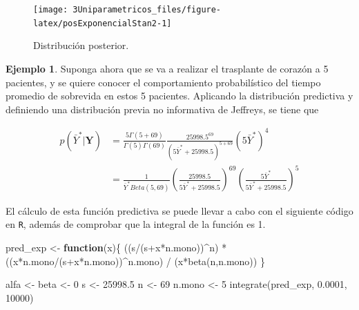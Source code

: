 \documentclass[
  10pt,
  spanish,
]{book}
\newenvironment{Shaded}{\begin{snugshade}}{\end{snugshade}}
\newcommand{\ControlFlowTok}[1]{\textcolor[rgb]{0.13,0.29,0.53}{\textbf{#1}}}
\newcommand{\DecValTok}[1]{\textcolor[rgb]{0.00,0.00,0.81}{#1}}
\newcommand{\FloatTok}[1]{\textcolor[rgb]{0.00,0.00,0.81}{#1}}
\newcommand{\FunctionTok}[1]{\textcolor[rgb]{0.00,0.00,0.00}{#1}}
\newcommand{\NormalTok}[1]{#1}
\newcommand{\OtherTok}[1]{\textcolor[rgb]{0.56,0.35,0.01}{#1}}
\newcommand{\SpecialCharTok}[1]{\textcolor[rgb]{0.00,0.00,0.00}{#1}}
\theoremstyle{definition}
\theoremstyle{definition}
\newtheorem{example}{Ejemplo}[chapter]
\theoremstyle{definition}
\theoremstyle{definition}
\theoremstyle{remark}
\begin{document}
\begin{figure}

{\centering \texttt{[image: 3Uniparametricos\_files/figure-latex/posExponencialStan2-1]} 

}

\caption{Distribución posterior.}\label{fig:posExponencialStan2}
\end{figure}

\begin{example}
\protect\hypertarget{exm:unnamed-chunk-65}{}{\label{exm:unnamed-chunk-65} }Suponga ahora que se va a realizar el trasplante de corazón a 5 pacientes, y se quiere conocer el comportamiento probabilístico del tiempo promedio de sobrevida en estos 5 pacientes. Aplicando la distribución predictiva y definiendo una distribución previa no informativa de Jeffreys, se tiene que

\begin{align*}
p(\bar{Y}^*|\mathbf{Y})&=\frac{5\Gamma(5+69)}{\Gamma(5)\Gamma(69)}\frac{25998.5^{69}}{(5\bar{Y}^*+25998.5)^{5+69}}(5\bar{Y}^*)^4\\
&=\frac{1}{\bar{Y}^*Beta(5,69)}\left(\frac{25998.5}{5\bar{Y}^*+25998.5}\right)^{69}\left(\frac{5\bar{Y}^*}{5\bar{Y}^*+25998.5}\right)^5
\end{align*}

El cálculo de esta función predictiva se puede llevar a cabo con el siguiente código en \texttt{R}, además de comprobar que la integral de la función es 1.
\end{example}

\begin{Shaded}
\begin{Highlighting}[]
\NormalTok{pred\_exp }\OtherTok{\textless{}{-}} \ControlFlowTok{function}\NormalTok{(x)\{}
\NormalTok{  ((s}\SpecialCharTok{/}\NormalTok{(s}\SpecialCharTok{+}\NormalTok{x}\SpecialCharTok{*}\NormalTok{n.mono))}\SpecialCharTok{\^{}}\NormalTok{n) }\SpecialCharTok{*} 
\NormalTok{    ((x}\SpecialCharTok{*}\NormalTok{n.mono}\SpecialCharTok{/}\NormalTok{(s}\SpecialCharTok{+}\NormalTok{x}\SpecialCharTok{*}\NormalTok{n.mono))}\SpecialCharTok{\^{}}\NormalTok{n.mono) }\SpecialCharTok{/} 
\NormalTok{    (x}\SpecialCharTok{*}\FunctionTok{beta}\NormalTok{(n,n.mono))}
\NormalTok{\}}


\NormalTok{alfa }\OtherTok{\textless{}{-}}\NormalTok{ beta }\OtherTok{\textless{}{-}} \DecValTok{0}
\NormalTok{s }\OtherTok{\textless{}{-}} \FloatTok{25998.5}
\NormalTok{n }\OtherTok{\textless{}{-}} \DecValTok{69}
\NormalTok{n.mono }\OtherTok{\textless{}{-}} \DecValTok{5}
\FunctionTok{integrate}\NormalTok{(pred\_exp, }\FloatTok{0.0001}\NormalTok{, }\DecValTok{10000}\NormalTok{)}
\end{Highlighting}
\end{Shaded}
\end{document}
